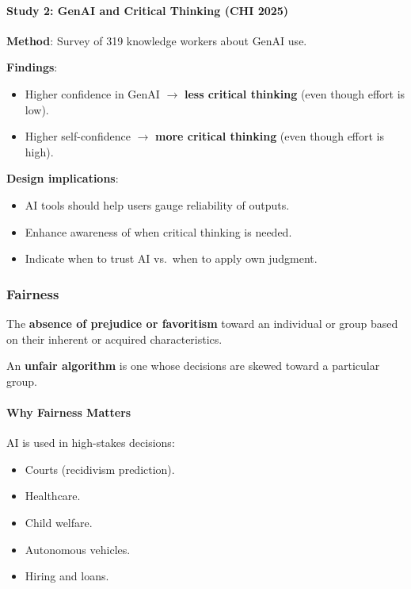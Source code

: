 \paragraph*{Study 2: GenAI and Critical Thinking (CHI 2025)}
\textbf{Method}: Survey of 319 knowledge workers about GenAI use.

\textbf{Findings}:
\begin{itemize}
  \item Higher confidence in GenAI $\to$ \textbf{less critical thinking} (even though effort is low).
  \item Higher self-confidence $\to$ \textbf{more critical thinking} (even though effort is high).
\end{itemize}

\textbf{Design implications}:
\begin{itemize}
  \item AI tools should help users gauge reliability of outputs.
  \item Enhance awareness of when critical thinking is needed.
  \item Indicate when to trust AI vs.\ when to apply own judgment.
\end{itemize}

\subsubsection*{Fairness}

\begin{defbox}[Fairness]
The \textbf{absence of prejudice or favoritism} toward an individual or group based on their inherent or acquired characteristics.

An \textbf{unfair algorithm} is one whose decisions are skewed toward a particular group.
\end{defbox}

\paragraph*{Why Fairness Matters}
AI is used in high-stakes decisions:
\begin{itemize}
  \item Courts (recidivism prediction).
  \item Healthcare.
  \item Child welfare.
  \item Autonomous vehicles.
  \item Hiring and loans.
\end{itemize}

